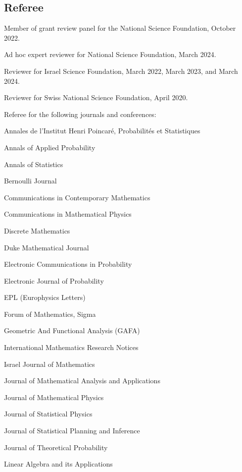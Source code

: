\documentclass[letterpaper]{article}
\renewenvironment{itemize}{
  \begin{list}{}{
    \setlength{\leftmargin}{1em}
  }
}{
  \end{list}
}
\begin{document}
\subsection*{Referee} 
\begin{itemize}
	\item Member of grant review panel for the National Science Foundation, October 2022. 
	\item Ad hoc expert reviewer for National Science Foundation, March 2024. 
	\item Reviewer for Israel Science Foundation, March 2022, March 2023, and March 2024.  
	\item Reviewer for Swiss National Science Foundation, April 2020.  
	\item Referee for the following journals and conferences: 
	\begin{itemize}
		\item Annales de l'Institut Henri Poincar\'{e}, Probabilit\'{e}s et Statistiques
		\item Annals of Applied Probability
		\item Annals of Statistics
		\item Bernoulli Journal
		\item Communications in Contemporary Mathematics
		\item Communications in Mathematical Physics
		\item Discrete Mathematics
		\item Duke Mathematical Journal
		\item Electronic Communications in Probability
		\item Electronic Journal of Probability
		\item EPL (Europhysics Letters)
		\item Forum of Mathematics, Sigma
		\item Geometric And Functional Analysis (GAFA)
		\item International Mathematics Research Notices
		\item Israel Journal of Mathematics 
		\item Journal of Mathematical Analysis and Applications
		\item Journal of Mathematical Physics
		\item Journal of Statistical Physics
		\item Journal of Statistical Planning and Inference
		\item Journal of Theoretical Probability
		\item Linear Algebra and its Applications

\end{itemize}
\end{itemize}
\end{document}
